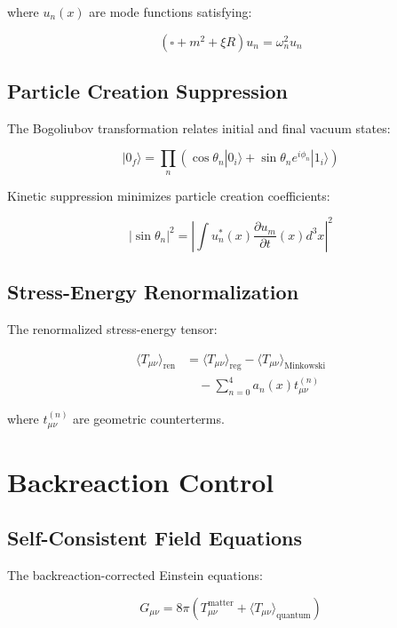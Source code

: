 \documentclass[12pt,a4paper]{article}
\begin{document}
where $u_n(x)$ are mode functions satisfying:

\begin{equation}
\left(\square + m^2 + \xi R\right) u_n = \omega_n^2 u_n
\end{equation}

\subsection{Particle Creation Suppression}

The Bogoliubov transformation relates initial and final vacuum states:

\begin{equation}
|0_f\rangle = \prod_n \left(\cos\theta_n |0_i\rangle + \sin\theta_n e^{i\phi_n} |1_i\rangle\right)
\end{equation}

Kinetic suppression minimizes particle creation coefficients:

\begin{equation}
|\sin\theta_n|^2 = \left|\int u_n^*(x) \frac{\partial u_m}{\partial t}(x) d^3x\right|^2
\end{equation}

\subsection{Stress-Energy Renormalization}

The renormalized stress-energy tensor:

\begin{align}
\langle T_{\mu\nu}\rangle_{\text{ren}} &= \langle T_{\mu\nu}\rangle_{\text{reg}} - \langle T_{\mu\nu}\rangle_{\text{Minkowski}} \\
&\quad - \sum_{n=0}^4 a_n(x) t_{\mu\nu}^{(n)}
\end{align}

where $t_{\mu\nu}^{(n)}$ are geometric counterterms.

\section{Backreaction Control}

\subsection{Self-Consistent Field Equations}

The backreaction-corrected Einstein equations:

\begin{equation}
G_{\mu\nu} = 8\pi \left(T_{\mu\nu}^{\text{matter}} + \langle T_{\mu\nu}\rangle_{\text{quantum}}\right)
\end{equation}
\end{document}

